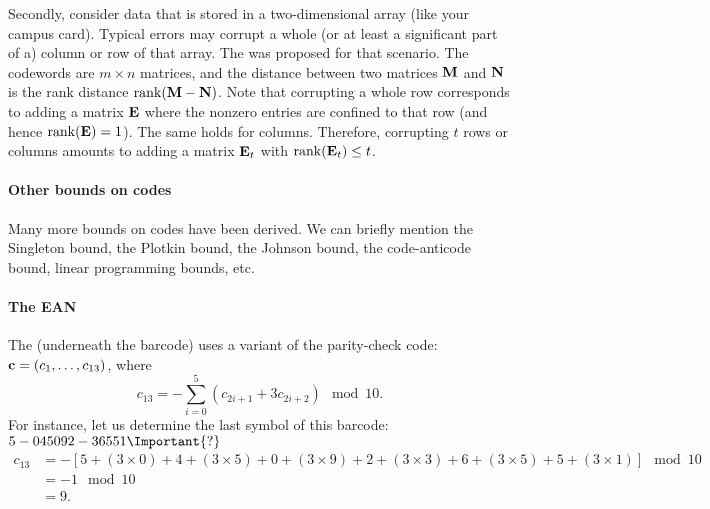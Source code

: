 \documentclass[a4paper, 11pt, openany]{book}
\begin{document}
Secondly, consider data that is stored in a two-dimensional array (like your campus card). Typical errors may corrupt a whole (or at least a significant part of a) column or row of that array. The  was proposed for that scenario. The codewords are $m \times n$ matrices, and the distance between two matrices ${\bf M}$ and ${\bf N}$ is the rank distance $\mathrm{rank}({\bf M} - {\bf N})$. Note that corrupting a whole row corresponds to adding a matrix ${\bf E}$ where the nonzero entries are confined to that row (and hence $\mathrm{rank}({\bf E}) = 1$). The same holds for columns. Therefore, corrupting $t$ rows or columns amounts to adding a matrix ${\bf E}_t$ with $\mathrm{rank}({\bf E}_t) \le t$.

\paragraph{Other bounds on codes}
Many more bounds on codes have been derived. We can briefly mention the Singleton bound, the Plotkin bound, the Johnson bound, the code-anticode bound, linear programming bounds, etc.


\paragraph{The EAN}
The  (underneath the barcode) uses a variant of the parity-check code: ${\bf c} = (c_1,\ldots,c_{13})$, where
\[
	c_{13} = -\sum_{i=0}^5 (c_{2i+1} + 3c_{2i+2}) \mod 10.
\]
For instance, let us determine the last symbol of this barcode: $5-045092-36551\Important{?}$
\begin{align*}
	c_{13} &= -\left[5 + (3 \times 0) + 4 + (3 \times 5) + 0 + (3 \times 9) + 2 + (3 \times 3) + 6 + (3 \times 5) + 5 + (3 \times 1)  \right] \mod 10\\
	&= -1 \mod 10\\
	&= 9.
\end{align*}

\end{document}
